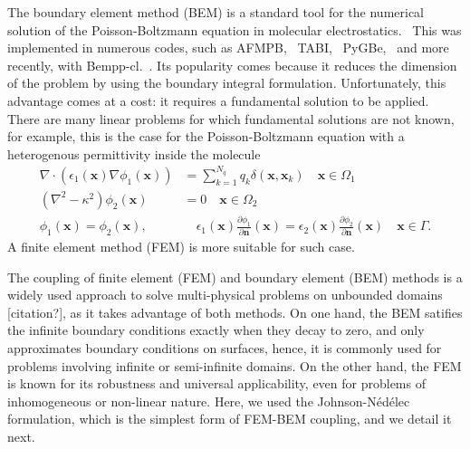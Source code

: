 The boundary element method (BEM) is a standard tool for the numerical solution of the Poisson-Boltzmann equation in molecular electrostatics.~\cite{ZauharMorgan1985, Shaw1985} This was implemented in numerous codes, such as AFMPB,~\cite{LuETal2006} TABI,~\cite{GengKrasny2013} PyGBe,~\cite{CooperBardhanBarba2014,cooper2016pygbe} and more recently, with Bempp-cl.~\cite{search2022towards}. Its popularity comes because it reduces the dimension of the problem by using the boundary integral formulation. Unfortunately, this advantage comes at a cost: it requires a fundamental solution to be applied. There are many linear problems for which fundamental solutions are not known, for example, this is the case for the Poisson-Boltzmann equation with a heterogenous permittivity inside the molecule
%
   \begin{align} \label{eq:pbe_vp}
\nabla \cdot \left(\epsilon_1(\mathbf{x}) \nabla \phi_1(\mathbf{x})\right) &= \sum_{k=1}^{N_q} q_k\delta(\mathbf{x},\mathbf{x}_k) \quad  \mathbf{x} \in \Omega_1\nonumber\\
\left(\nabla^2 - \kappa^2\right)\phi_2(\mathbf{x})  &= 0 \quad\mathbf{x}\in\Omega_2\nonumber\\
\phi_1(\mathbf{x})  = \phi_2(\mathbf{x}),  &\quad \epsilon_1(\mathbf{x})\frac{\partial\phi_1}{\partial\mathbf{n}}(\mathbf{x})  = \epsilon_2(\mathbf{x})\frac{\partial\phi_2}{\partial\mathbf{n}}(\mathbf{x})  \quad \mathbf{x}\in \Gamma. 
\end{align}
%
A finite element method (FEM) is more suitable for such case.

The coupling of finite element (FEM) and boundary element (BEM) methods is a widely used approach to solve multi-physical problems on unbounded domains [citation?], as it takes advantage of both methods. On one hand, the BEM satifies the infinite boundary conditions exactly when they decay to zero, and only approximates boundary conditions on surfaces, hence, it is commonly used for problems involving infinite or semi-infinite domains. On the other hand, the FEM is known for its robustness and universal applicability, even for problems of inhomogeneous or non-linear nature.
Here, we used the Johnson-N\'ed\'elec formulation,\cite{johnson1980coupling} which is the simplest form of FEM-BEM coupling, and we detail it next.


